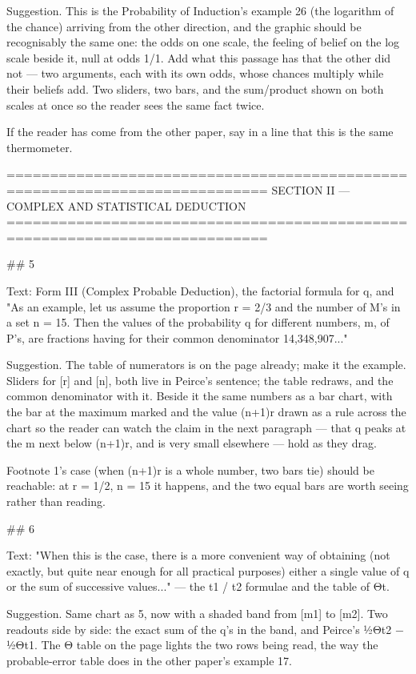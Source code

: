 Suggestion. This is the Probability of Induction's example 26 (the logarithm of
the chance) arriving from the other direction, and the graphic should be
recognisably the same one: the odds on one scale, the feeling of belief on the
log scale beside it, null at odds 1/1. Add what this passage has that the other
did not — two arguments, each with its own odds, whose chances multiply while
their beliefs add. Two sliders, two bars, and the sum/product shown on both
scales at once so the reader sees the same fact twice.

If the reader has come from the other paper, say in a line that this is the same
thermometer.


============================================================================
SECTION II — COMPLEX AND STATISTICAL DEDUCTION
============================================================================

## 5

Text: Form III (Complex Probable Deduction), the factorial formula for q, and
"As an example, let us assume the proportion r = 2/3 and the number of M's in a
set n = 15. Then the values of the probability q for different numbers, m, of
P's, are fractions having for their common denominator 14,348,907..."

Suggestion. The table of numerators is on the page already; make it the example.
Sliders for [r] and [n], both live in Peirce's sentence; the table redraws, and
the common denominator with it. Beside it the same numbers as a bar chart, with
the bar at the maximum marked and the value (n+1)r drawn as a rule across the
chart so the reader can watch the claim in the next paragraph — that q peaks at
the m next below (n+1)r, and is very small elsewhere — hold as they drag.

Footnote 1's case (when (n+1)r is a whole number, two bars tie) should be
reachable: at r = 1/2, n = 15 it happens, and the two equal bars are worth
seeing rather than reading.


## 6

Text: "When this is the case, there is a more convenient way of obtaining (not
exactly, but quite near enough for all practical purposes) either a single value
of q or the sum of successive values..." — the t1 / t2 formulae and the table
of Θt.

Suggestion. Same chart as 5, now with a shaded band from [m1] to [m2]. Two
readouts side by side: the exact sum of the q's in the band, and Peirce's
½Θt2 − ½Θt1. The Θ table on the page lights the two rows being read, the way
the probable-error table does in the other paper's example 17.

